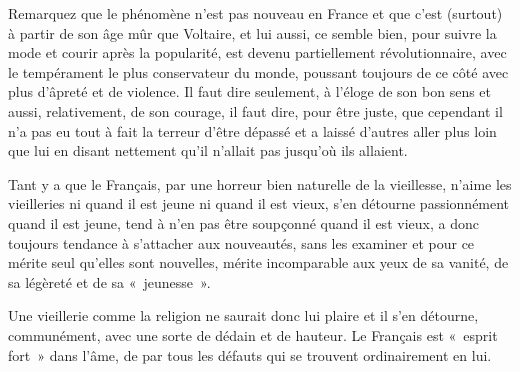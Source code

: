 \documentclass[french,twoside]{book} %
\newcommand{\astertri}{\medskip\par\centerline{\color{rubric}\large\selectfont{\syms ✻\,✻\,✻}}\medskip\par}%
\begin{document}
Remarquez que le phénomène n’est pas nouveau en France et que c’est (surtout) à partir de son âge mûr que Voltaire, et lui aussi, ce semble bien, pour suivre la mode et courir après la popularité, est devenu partiellement révolutionnaire, avec le tempérament le plus conservateur du monde, poussant toujours de ce côté avec plus d’âpreté et de violence. Il faut dire seulement, à l’éloge de son bon sens et aussi, relativement, de son courage, il faut dire, pour être juste, que cependant il n’a pas eu tout à fait la terreur d’être dépassé et a laissé d’autres aller plus loin que lui en disant nettement qu’il n’allait pas jusqu’où ils allaient.\par
Tant y a que le Français, par une horreur bien naturelle de la vieillesse, n’aime les vieilleries ni quand il est jeune ni quand il est vieux, s’en détourne passionnément quand il est jeune, tend à n’en pas être soupçonné quand il est vieux, a donc toujours tendance à s’attacher aux nouveautés, sans les examiner et pour ce mérite seul qu’elles sont nouvelles, mérite incomparable aux yeux de sa vanité, de sa légèreté et de sa « jeunesse ».\par
Une vieillerie comme la religion ne saurait donc lui plaire et il s’en détourne, communément, avec une sorte de dédain et de hauteur. Le Français est « esprit fort » dans l’âme, de par tous  les défauts qui se trouvent ordinairement en lui.\par

\astertri
\end{document}
